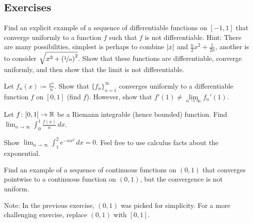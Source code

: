 \subsection{Exercises}

\begin{exercise}
Find an explicit example of a sequence of
differentiable functions on $[-1,1]$ that converge uniformly to
a function $f$ such that $f$ is not differentiable.
Hint:
There are many possibilities,
simplest is perhaps to combine $\left\lvert {x} \right\rvert$ and $\frac{n}{2}x^2 +
\frac{1}{2n}$, another is to
consider $\sqrt{x^2+{(\nicefrac{1}{n})}^2}$.  Show that these functions are differentiable,
converge uniformly, and then show that the limit is not differentiable.
\end{exercise}

\begin{exercise}
Let $f_n(x) \coloneqq \frac{x^n}{n}$.  Show that $\{ f_n \}_{n=1}^\infty$ converges uniformly to
a differentiable function $f$ on $[0,1]$ (find $f$).  However, show that
$f'(1) \not= \lim\limits_{n\to\infty} f_n'(1)$.
\end{exercise}

%
\begin{exercise}
Let $f \colon [0,1] \to {\mathbb{R}}$ be a Riemann integrable (hence bounded)
function.  Find
$\displaystyle \lim_{n\to\infty} \int_0^1 \frac{f(x)}{n} \,dx$.
\end{exercise}

\begin{exercise}
Show
$\displaystyle \lim_{n\to\infty} \int_1^2 e^{-nx^2} \,dx = 0$.  Feel free to
use calculus facts about the exponential.
\end{exercise}

\begin{exercise}
Find an example of a sequence of continuous functions on $(0,1)$ that converges 
pointwise to a continuous function on $(0,1)$, but the convergence is not
uniform.
\end{exercise}

\begin{exnote}
Note: In the previous exercise, $(0,1)$ was picked for simplicity.  For a
more challenging exercise, replace $(0,1)$ with $[0,1]$.
\end{exnote}

